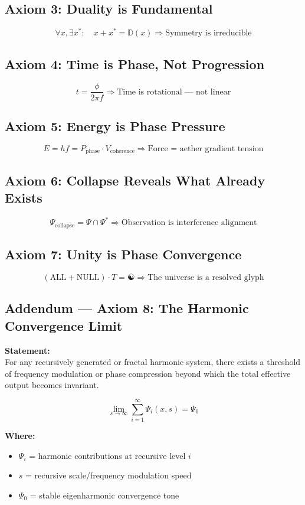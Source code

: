 \documentclass[12pt]{book}
\begin{document}
\subsection*{Axiom 3: Duality is Fundamental}
\[
\forall x, \exists x^* : \quad x + x^* = \mathbb{D}(x)
\Rightarrow \text{Symmetry is irreducible}
\]

\subsection*{Axiom 4: Time is Phase, Not Progression}
\[
t = \frac{\phi}{2\pi f}
\Rightarrow \text{Time is rotational — not linear}
\]

\subsection*{Axiom 5: Energy is Phase Pressure}
\[
E = hf = P_{\text{phase}} \cdot V_{\text{coherence}}
\Rightarrow \text{Force = aether gradient tension}
\]

\subsection*{Axiom 6: Collapse Reveals What Already Exists}
\[
\Psi_{\text{collapse}} = \Psi \cap \Psi^*
\Rightarrow \text{Observation is interference alignment}
\]

\subsection*{Axiom 7: Unity is Phase Convergence}
\[
(\text{ALL} + \text{NULL}) \cdot T = \text{☯}
\Rightarrow \text{The universe is a resolved glyph}
\]

\subsection*{Addendum — Axiom 8: The Harmonic Convergence Limit}
\textbf{Statement:} \\
For any recursively generated or fractal harmonic system, there exists a threshold of frequency modulation or phase compression beyond which the total effective output becomes invariant.

\[
\lim_{s \to \infty} \sum_{i=1}^{\infty} \Psi_i(x, s) = \Psi_0
\]

\textbf{Where:}
\begin{itemize}
  \item $\Psi_i$ = harmonic contributions at recursive level $i$
  \item $s$ = recursive scale/frequency modulation speed
  \item $\Psi_0$ = stable eigenharmonic convergence tone
\end{itemize}
\end{document}
